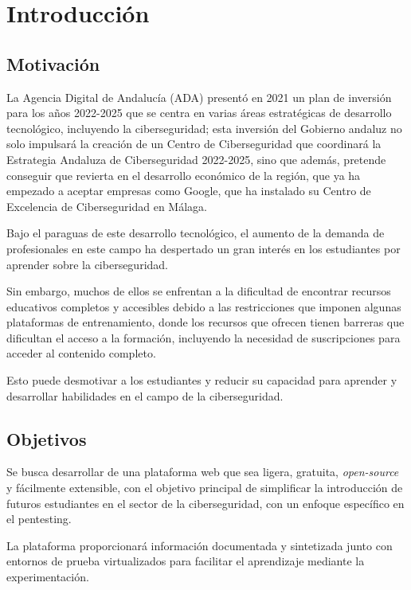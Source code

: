 \chapter{Introducción}

    \section{Motivación}
        
        La Agencia Digital de Andalucía (ADA) presentó en 2021 un plan de inversión para los años 2022-2025 que se centra en varias áreas estratégicas de desarrollo tecnológico, incluyendo la ciberseguridad; esta inversión del Gobierno andaluz no solo impulsará la creación de un Centro de Ciberseguridad que coordinará la Estrategia Andaluza de Ciberseguridad 2022-2025, sino que además, pretende conseguir que revierta en el desarrollo económico de la región, que ya ha empezado a aceptar empresas como Google, que ha instalado su Centro de Excelencia de Ciberseguridad en Málaga.
        
        Bajo el paraguas de este desarrollo tecnológico, el aumento de la demanda de profesionales en este campo ha despertado un gran interés en los estudiantes por aprender sobre la ciberseguridad.
        
        Sin embargo, muchos de ellos se enfrentan a la dificultad de encontrar recursos educativos completos y accesibles debido a las restricciones que imponen algunas plataformas de entrenamiento, donde los recursos que ofrecen tienen barreras que dificultan el acceso a la formación, incluyendo la necesidad de suscripciones para acceder al contenido completo.
        
        Esto puede desmotivar a los estudiantes y reducir su capacidad para aprender y desarrollar habilidades en el campo de la ciberseguridad.
    
    
    \section{Objetivos}
        \label{sec:objetivos}
    
        Se busca desarrollar de una plataforma web que sea ligera, gratuita, \textit{open-source} y fácilmente extensible, con el objetivo principal de simplificar la introducción de futuros estudiantes en el sector de la ciberseguridad, con un enfoque específico en el pentesting.
        
        La plataforma proporcionará información documentada y sintetizada junto con entornos de prueba virtualizados para facilitar el aprendizaje mediante la experimentación.
        
